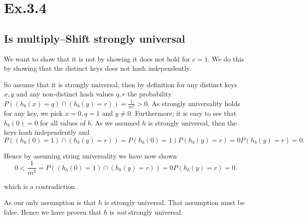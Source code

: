 \section*{Ex.3.4}
\subsection*{Is multiply--Shift strongly universal}

We want to show that it is not by showing it does not hold for $c=1$. We do this by showing that the distinct keys does not hash independently.

So assume that it is strongly universal, then by definition  for any distinct keys $x,y$ and any non-distinct hash values $q,r$ the probability $P((h_b(x) = q) \cap (h_b(y) = r)) = \frac{1}{m^2}>0$. As strongly universality holds for any key, we pick $x=0, q=1$ and $y\neq 0$. Furthermore; it is easy to see that $h_b(0)=0$ for all values of $b$. As we assumed $h$ is strongly universal, then the keys hash independently and
$$
P((h_b(0) = 1) \cap (h_b(y) = r)) = P(h_b(0) = 1) P(h_b(y) = r) = 0 P(h_b(y) = r) = 0.
$$

Hence by assuming string universality we have now shown
$$
0< \frac{1}{m^2} = P((h_b(0) = 1) \cap (h_b(y) = r)) = 0 P(h_b(y) = r) = 0.
$$

which is a contradiction.

As our only assumption is that $h$ is strongly universal. That assumption must be false. Hence we have proven that $h$ is \emph{not} strongly universal.